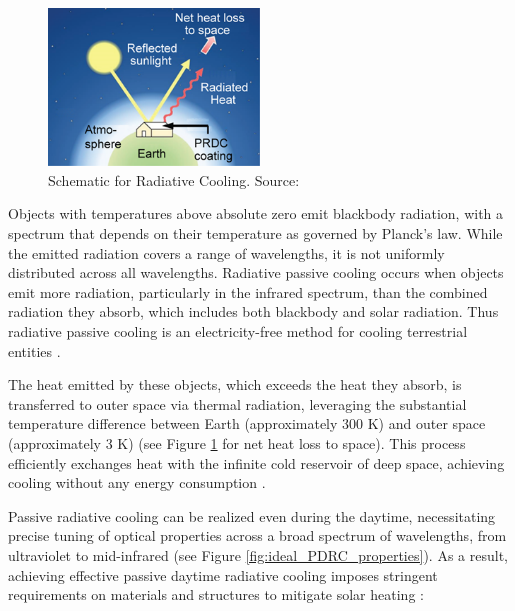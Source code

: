 \begin{figure}
  \centering
  \includegraphics[width=0.5\textwidth]{Chapters/Figures/Chapter 1 Figures/Schematic for Radiative Cooling.png}
  \caption[Schematic for Radiative Cooling] {Schematic for Radiative Cooling. Source: \cite{yang_passive_2020}}
  \label{fig:PDRC_Schematic}
\end{figure}

Objects with temperatures above absolute zero emit blackbody radiation, with a spectrum that depends on their temperature as governed by Planck's law. While the emitted radiation covers a range of wavelengths, it is not uniformly distributed across all wavelengths. Radiative passive cooling occurs when objects emit more radiation, particularly in the infrared spectrum, than the combined radiation they absorb, which includes both blackbody and solar radiation. Thus radiative passive cooling is an electricity-free method for cooling terrestrial entities \cite{yang_passive_2020}.

The heat emitted by these objects, which exceeds the heat they absorb, is transferred to outer space via thermal radiation, leveraging the substantial temperature difference between Earth (approximately 300 K) and outer space (approximately 3 K) (see Figure \ref{fig:PDRC_Schematic} for net heat loss to space). This process efficiently exchanges heat with the infinite cold reservoir of deep space, achieving cooling without any energy consumption \cite{chen_passive_2022}.

Passive radiative cooling can be realized even during the daytime, necessitating precise tuning of optical properties across a broad spectrum of wavelengths, from ultraviolet to mid-infrared (see Figure \ref{fig:ideal_PDRC_properties}). As a result, achieving effective passive daytime radiative cooling imposes stringent requirements on materials and structures to mitigate solar heating \cite{yang_passive_2020}:

